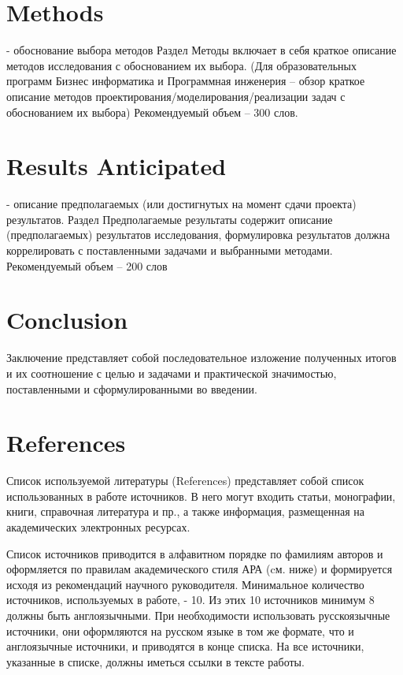 \documentclass[PI]{ProjectProposal}
\begin{document}
\chapter*{Methods}
- обоснование выбора методов
Раздел Методы включает в себя краткое описание методов исследования с обоснованием их выбора. (Для образовательных программ Бизнес информатика и Программная инженерия – обзор краткое описание методов проектирования/моделирования/реализации задач с обоснованием их выбора) Рекомендуемый объем – 300 слов.


\chapter*{Results Anticipated}
- описание предполагаемых (или достигнутых на момент сдачи проекта) результатов.
Раздел Предполагаемые результаты содержит описание (предполагаемых) результатов исследования, формулировка результатов должна коррелировать с поставленными задачами и выбранными методами. Рекомендуемый объем – 200 слов

\chapter*{Conclusion}
Заключение представляет собой последовательное изложение полученных итогов и их соотношение с целью и задачами и практической значимостью, поставленными и сформулированными во введении.

\chapter*{References}
Список используемой литературы (References) представляет собой список использованных в работе источников. В него могут входить статьи, монографии, книги, справочная литература и пр., а также информация, размещенная на академических электронных ресурсах.


Список источников приводится в алфавитном порядке по фамилиям авторов и оформляется по правилам академического стиля АРА (cм. ниже) и формируется исходя из рекомендаций научного руководителя. Минимальное количество источников, используемых в работе, - 10. Из этих 10 источников минимум 8 должны быть англоязычными. При необходимости использовать русскоязычные источники, они оформляются на русском языке в том же формате, что и англоязычные источники, и приводятся в конце списка. На все источники, указанные в списке, должны иметься ссылки в тексте работы.
\end{document}
